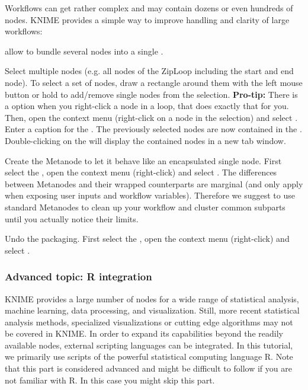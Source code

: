 Workflows can get rather complex and may contain dozens or even hundreds of nodes. KNIME provides a simple way to improve handling and clarity of large workflows:

 allow to bundle several nodes into a single .

\begin{task}
Select multiple nodes (e.g. all nodes of the ZipLoop including the start and end node). To select a set of nodes, draw a rectangle around them with the left mouse button or hold  to add/remove single nodes from the selection. \textbf{Pro-tip:} There is a  option when you right-click a node in a loop, that does exactly that for you. Then, open the context menu (right-click on a node in the selection) and select . Enter a caption for the . The previously selected nodes are now contained in the . Double-clicking on the  will display the contained nodes in a new tab window. 
\end{task}

\begin{task}
Create the Metanode to let it behave like an encapsulated single node. First select the , 
open the context menu (right-click) and select . The differences between Metanodes and their 
wrapped counterparts are marginal (and only apply when exposing user inputs and workflow variables). Therefore we 
suggest to use standard Metanodes to clean up your workflow and cluster common subparts until you actually notice 
their limits.
\end{task}

\begin{task}
Undo the packaging. First select the , open the context menu (right-click) and select .
\end{task}

\subsubsection{Advanced topic: R integration}

KNIME provides a large number of nodes for a wide range of statistical analysis, machine learning, data processing, 
and visualization. Still, more recent statistical analysis methods, specialized visualizations or cutting edge 
algorithms may not be covered in KNIME. In order to expand its capabilities beyond the readily available nodes, 
external scripting languages can be integrated. In this tutorial, we primarily use scripts of the powerful 
statistical computing language R. Note that this part is considered advanced and might be difficult to follow if you 
are not familiar with R. In this case you might skip this part.

